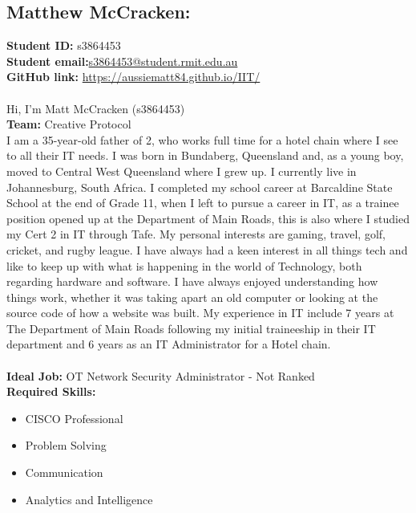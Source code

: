 \documentclass[11pt, oneside, a4paper, titlepage]{article}
\begin{document}
\subsection{Matthew McCracken:}
\textbf{Student ID:} \hfill s3864453\\
\textbf{Student email:}\hfill \href{mailto:s3864453@student.rmit.edu.au}{s3864453@student.rmit.edu.au}\\
\textbf{GitHub link:} \hfill \href{https://aussiematt84.github.io/IIT/}{https://aussiematt84.github.io/IIT/}\\
\\
Hi, I'm Matt McCracken (s3864453) 
\\
\textbf{Team:} Creative Protocol 
\\
I am a 35-year-old father of 2, who works full time for a hotel chain where I see to all their IT needs. I was born in Bundaberg, Queensland and, as a young boy, moved to Central West Queensland where I grew up. I currently live in Johannesburg, South Africa. I completed my school career at Barcaldine State School at the end of Grade 11, when I left to pursue a career in IT, as a trainee position opened up at the Department of Main Roads, this is also where I studied my Cert 2 in IT through Tafe. My personal interests are gaming, travel, golf, cricket, and rugby league. I have always had a keen interest in all things tech and like to keep up with what is happening in the world of Technology, both regarding hardware and software. I have always enjoyed understanding how things work, whether it was taking apart an old computer or looking at the source code of how a website was built. My experience in IT include 7 years at The Department of Main Roads following my initial traineeship in their IT department and 6 years as an IT Administrator for a Hotel chain. 
\\
\\
\textbf{Ideal Job:} \hfill OT Network Security Administrator - Not Ranked\\
\textbf{Required Skills: }
\begin{itemize}
	\setlength\itemsep{0em}
	\item CISCO Professional
	\item Problem Solving
	\item Communication
	\item Analytics and Intelligence
\end{itemize}
\newpage

\end{document}
